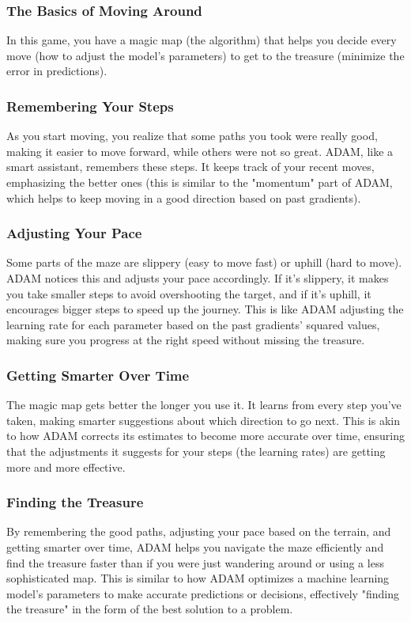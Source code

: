 \documentclass[journal]{IEEEtran}
\begin{document}
\subsubsection*{The Basics of Moving Around}
In this game, you have a magic map (the algorithm) that helps you decide every move (how to adjust the model's parameters) to get to the treasure (minimize the error in predictions).

\subsubsection*{Remembering Your Steps}
As you start moving, you realize that some paths you took were really good, making it easier to move forward, while others were not so great. ADAM, like a smart assistant, remembers these steps. It keeps track of your recent moves, emphasizing the better ones (this is similar to the "momentum" part of ADAM, which helps to keep moving in a good direction based on past gradients).

\subsubsection*{Adjusting Your Pace}
Some parts of the maze are slippery (easy to move fast) or uphill (hard to move). ADAM notices this and adjusts your pace accordingly. If it's slippery, it makes you take smaller steps to avoid overshooting the target, and if it's uphill, it encourages bigger steps to speed up the journey. This is like ADAM adjusting the learning rate for each parameter based on the past gradients' squared values, making sure you progress at the right speed without missing the treasure.

\subsubsection*{Getting Smarter Over Time}
The magic map gets better the longer you use it. It learns from every step you've taken, making smarter suggestions about which direction to go next. This is akin to how ADAM corrects its estimates to become more accurate over time, ensuring that the adjustments it suggests for your steps (the learning rates) are getting more and more effective.  
   
\subsubsection*{Finding the Treasure}
By remembering the good paths, adjusting your pace based on the terrain, and getting smarter over time, ADAM helps you navigate the maze efficiently and find the treasure faster than if you were just wandering around or using a less sophisticated map. This is similar to how ADAM optimizes a machine learning model's parameters to make accurate predictions or decisions, effectively "finding the treasure" in the form of the best solution to a problem. 
  
\end{document}
